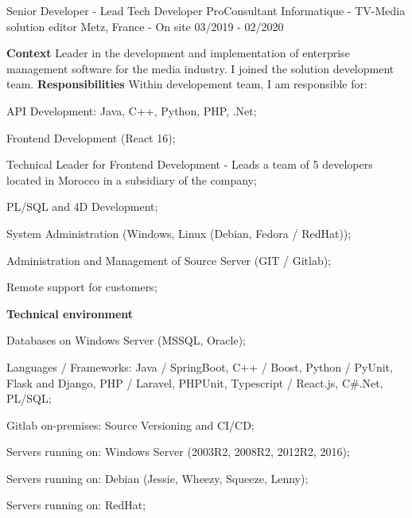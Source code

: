 \begin{cventries}
  \cventry
    {Senior Developer - Lead Tech Developer} %
    {ProConsultant Informatique - TV-Media solution editor} %
    {Metz, France - On site} %
    {03/2019 - 02/2020} %
    {
      \textbf{Context}
      \newline
      Leader in the development and implementation of enterprise management software for the
      media industry. I joined the solution development team.
      \newline \vspace{2pt}
      \textbf{Responsibilities}
      \newline \vspace{2pt}
      Within developement team, I am responsible for:
      \newline \vspace{12pt}
      \begin{cvitems}
        \item {API Development: Java, C++, Python, PHP, .Net;}
        \item {Frontend Development (React 16);}
        \item {Technical Leader for Frontend Development - Leads a team of 5 developers located in Morocco in a subsidiary of the company;}
        \item {PL/SQL and 4D Development;}
        \item {System Administration (Windows, Linux (Debian, Fedora / RedHat));}
        \item {Administration and Management of Source Server (GIT / Gitlab);}
        \item {Remote support for customers;}
      \end{cvitems}
      \textbf{Technical environment}
      \newline \vspace{12pt}
      \begin{cvitems}
        \item {Databases on Windows Server (MSSQL, Oracle);}
        \item {Languages / Frameworks: Java / SpringBoot, C++ / Boost, Python / PyUnit, Flask and Django, PHP / Laravel, PHPUnit, Typescript / React.js, C\#.Net, PL/SQL;}
        \item {Gitlab on-premises: Source Versioning and CI/CD;}
        \item {Servers running on: Windows Server (2003R2, 2008R2, 2012R2, 2016);}
        \item {Servers running on: Debian (Jessie, Wheezy, Squeeze, Lenny);}
        \item {Servers running on: RedHat;}
      \end{cvitems}
    }


\end{cventries}
